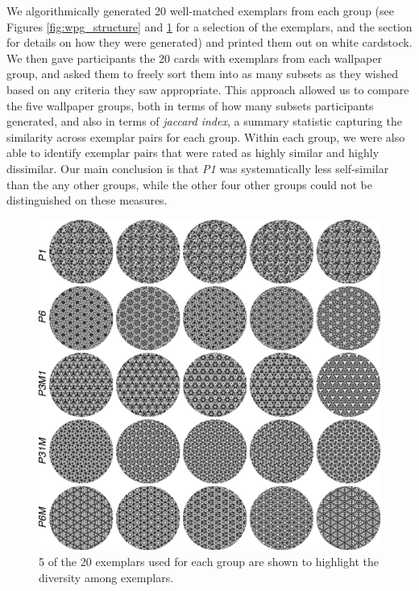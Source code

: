 \documentclass[11pt, twoside]{article}
\begin{document}
We algorithmically generated 20 well-matched exemplars from each group (see Figures \ref{fig:wpg_structure} and \ref{fig:wpg_exemplars} for a selection of the exemplars, and the  section for details on how they were generated) and printed them out on white cardstock. We then gave participants the 20 cards with exemplars from each wallpaper group, and asked them to freely sort them into as many subsets as they wished based on any criteria they saw appropriate. This approach allowed us to compare the five wallpaper groups, both in terms of how many subsets participants generated, and also in terms of \textit{jaccard index}, a summary statistic capturing the similarity across exemplar pairs for each group. Within each group, we were also able to identify exemplar pairs that were rated as highly similar and highly dissimilar. Our main conclusion is that \textit{P1} was systematically less self-similar than the any other groups, while the other four other groups could not be distinguished on these measures.
\begin{figure}[t]
	\centering
	\includegraphics[width=\linewidth]{./figures//wpg_exemplars.pdf}
	\caption{5 of the 20 exemplars used for each group are shown to highlight the diversity among exemplars.}
	\label{fig:wpg_exemplars}
\end{figure}
\end{document}
